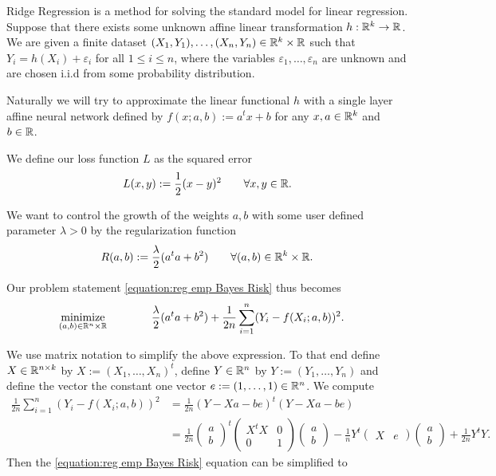 Ridge Regression is a method for solving the standard model for 
linear regression. Suppose that there
exists some unknown affine linear transformation
$ h:\mathbb{R}^k\rightarrow \mathbb{R} $. We are given a finite dataset
$ (X_1,Y_1),\ldots,(X_n,Y_n)\in\mathbb{R}^{k}\times \mathbb{R} $
such that $ Y_i=h(X_i)+\varepsilon_i $ for
all $ 1\leq i\leq n $, where the variables
$ \varepsilon_1,\ldots,\varepsilon_n $
are unknown and are chosen i.i.d from some  
probability distribution.\smallskip

Naturally we will try to approximate the
linear functional $ h $ with a single
layer affine neural network defined by
$ f(x;a,b):=a^t x+b $ for any 
$ x,a\in\mathbb{R}^k $ and $ b\in\mathbb{R} $.\smallskip

We define our loss function $ L $ as the squared error 
\begin{align*}
	L(x,y):=\frac{1}{2}(x-y)^2
	\qquad\forall x,y\in\mathbb{R}.
\end{align*}

We want to control the growth of
the weights $ a,b $ with some
user defined
parameter $ \lambda>0 $ by the 
regularization function
\begin{align*}
	R(a,b):=\frac{\lambda}{2}(a^ta+b^2)
	\qquad\forall (a,b)\in\mathbb{R}^k\times\mathbb{R}.
\end{align*}

Our problem statement \ref{equation:reg emp Bayes Risk}
thus becomes
\begin{align*}
	\operatorname*{\mathrm{minimize}}_{(a,b)\in \mathbb{R}^n\times\mathbb{R}}
	\qquad &\qquad
	\frac{\lambda}{2}(a^ta+b^2)+
	\frac{1}{2n}\sum_{i=1}^n (Y_i-f(X_i;a,b))^2.
\end{align*}

We use matrix notation to simplify the above expression.
To that end define $ X\in\mathbb{R}^{n\times k} $ by $ X:=(X_1,\ldots, X_n)^t $,
define $ Y\in\mathbb{R}^n $ by $ Y:=(Y_1,\ldots,Y_n) $ and define
the vector the constant one vector $ e:=(1,\ldots,1)\in\mathbb{R}^n $. We compute
\begin{align*}
	\frac{1}{2n}\sum_{i=1}^n (Y_i-f(X_i;a,b))^2
	&=\frac{1}{2n}(Y-Xa-be)^t(Y-Xa-be)\\
	&=\frac{1}{2n}
	\begin{pmatrix}
		a \\ b
	\end{pmatrix}^t
	\begin{pmatrix}
		X^t X & 0\\
		0 & 1
	\end{pmatrix}
	\begin{pmatrix}
		a \\ b
	\end{pmatrix}
	-\frac{1}{n}
		Y^t 
	\begin{pmatrix}
		X & e
	\end{pmatrix}
	\begin{pmatrix}
		a \\ b
	\end{pmatrix}
	+\frac{1}{2n}Y^tY.
\end{align*}
Then the \ref{equation:reg emp Bayes Risk} equation can be simplified to

